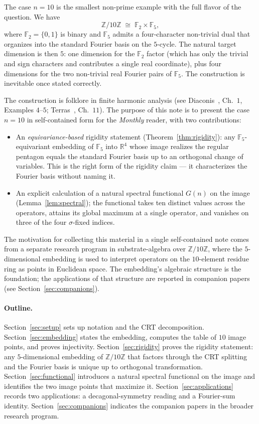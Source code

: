 \documentclass[11pt,reqno]{amsart}
\theoremstyle{definition}
\newcommand{\Z}{\mathbb{Z}}
\newcommand{\R}{\mathbb{R}}
\newcommand{\F}{\mathbb{F}}
\begin{document}
The case $n = 10$ is the smallest non-prime example with the full
flavor of the question. We have
\[
  \Z/10\Z \;\cong\; \F_2 \times \F_5,
\]
where $\F_2 = \{0,1\}$ is binary and $\F_5$ admits a four-character
non-trivial dual that organizes into the standard Fourier basis on
the $5$-cycle. The natural target dimension is then $5$: one
dimension for the $\F_2$ factor (which has only the trivial and
sign characters and contributes a single real coordinate), plus
four dimensions for the two non-trivial real Fourier pairs of
$\F_5$. The construction is inevitable once stated correctly.

The construction is folklore in finite harmonic analysis (see
Diaconis~\cite{Diaconis1988}, Ch.~$1$, Examples $4$--$5$;
Terras~\cite{Terras1999}, Ch.~$11$). The purpose of this note is
to present the case $n = 10$ in self-contained form for the
\emph{Monthly} reader, with two contributions:

\begin{itemize}\setlength\itemsep{2pt}
\item An \emph{equivariance-based} rigidity statement
(Theorem~\ref{thm:rigidity}): any $\F_{5}$-equivariant embedding of
$\F_{5}$ into $\R^{4}$ whose image realizes the regular pentagon
equals the standard Fourier basis up to an orthogonal change of
variables. This is the right form of the rigidity claim --- it
characterizes the Fourier basis without naming it.
\item An explicit calculation of a natural spectral functional
$G(n)$ on the image (Lemma~\ref{lem:spectral}); the functional
takes ten distinct values across the operators, attains its global
maximum at a single operator, and vanishes on three of the four
$\sigma$-fixed indices.
\end{itemize}

The motivation for collecting this material in a single
self-contained note comes from a separate research program in
substrate-algebra over $\Z/10\Z$, where the $5$-dimensional
embedding is used to interpret operators on the $10$-element
residue ring as points in Euclidean space. The embedding's
algebraic structure is the foundation; the applications of that
structure are reported in companion papers (see
Section~\ref{sec:companions}).

\paragraph{Outline.}
Section~\ref{sec:setup} sets up notation and the CRT decomposition.
Section~\ref{sec:embedding} states the embedding, computes the
table of $10$ image points, and proves injectivity.
Section~\ref{sec:rigidity} proves the rigidity statement: any
$5$-dimensional embedding of $\Z/10\Z$ that factors through the
CRT splitting and the Fourier basis is unique up to orthogonal
transformation.
Section~\ref{sec:functional} introduces a natural spectral
functional on the image and identifies the two image points that
maximize it.
Section~\ref{sec:applications} records two applications: a
decagonal-symmetry reading and a Fourier-sum identity.
Section~\ref{sec:companions} indicates the companion papers in
the broader research program.
\end{document}

